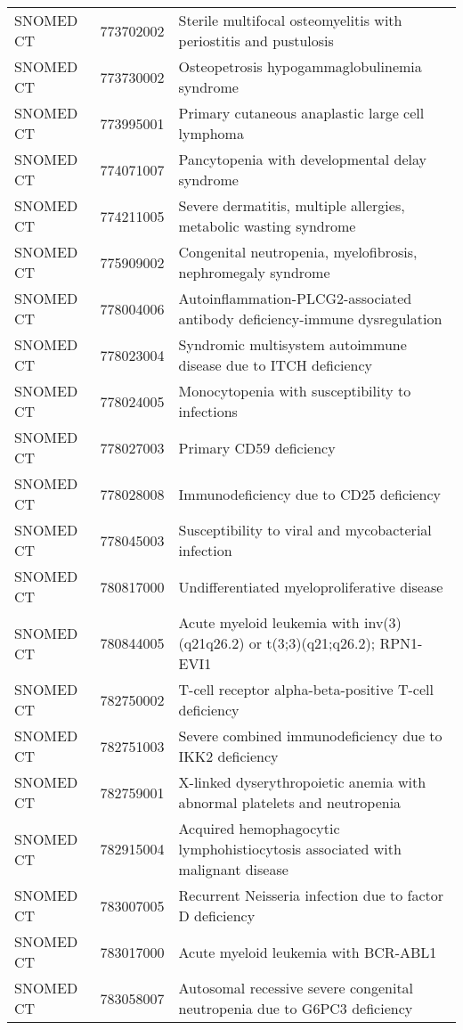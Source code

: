 \begin{longtable}{p{}p{}p{}}
  SNOMED CT & 773702002 & Sterile multifocal osteomyelitis with periostitis and pustulosis \\ 
  SNOMED CT & 773730002 & Osteopetrosis hypogammaglobulinemia syndrome \\ 
  SNOMED CT & 773995001 & Primary cutaneous anaplastic large cell lymphoma \\ 
  SNOMED CT & 774071007 & Pancytopenia with developmental delay syndrome \\ 
  SNOMED CT & 774211005 & Severe dermatitis, multiple allergies, metabolic wasting syndrome \\ 
  SNOMED CT & 775909002 & Congenital neutropenia, myelofibrosis, nephromegaly syndrome \\ 
  SNOMED CT & 778004006 & Autoinflammation-PLCG2-associated antibody deficiency-immune dysregulation \\ 
  SNOMED CT & 778023004 & Syndromic multisystem autoimmune disease due to ITCH deficiency \\ 
  SNOMED CT & 778024005 & Monocytopenia with susceptibility to infections \\ 
  SNOMED CT & 778027003 & Primary CD59 deficiency \\ 
  SNOMED CT & 778028008 & Immunodeficiency due to CD25 deficiency \\ 
  SNOMED CT & 778045003 & Susceptibility to viral and mycobacterial infection \\ 
  SNOMED CT & 780817000 & Undifferentiated myeloproliferative disease \\ 
  SNOMED CT & 780844005 & Acute myeloid leukemia with inv(3)(q21q26.2) or t(3;3)(q21;q26.2); RPN1-EVI1 \\ 
  SNOMED CT & 782750002 & T-cell receptor alpha-beta-positive T-cell deficiency \\ 
  SNOMED CT & 782751003 & Severe combined immunodeficiency due to IKK2 deficiency \\ 
  SNOMED CT & 782759001 & X-linked dyserythropoietic anemia with abnormal platelets and neutropenia \\ 
  SNOMED CT & 782915004 & Acquired hemophagocytic lymphohistiocytosis associated with malignant disease \\ 
  SNOMED CT & 783007005 & Recurrent Neisseria infection due to factor D deficiency \\ 
  SNOMED CT & 783017000 & Acute myeloid leukemia with BCR-ABL1 \\ 
  SNOMED CT & 783058007 & Autosomal recessive severe congenital neutropenia due to G6PC3 deficiency \\ 

\end{longtable}
